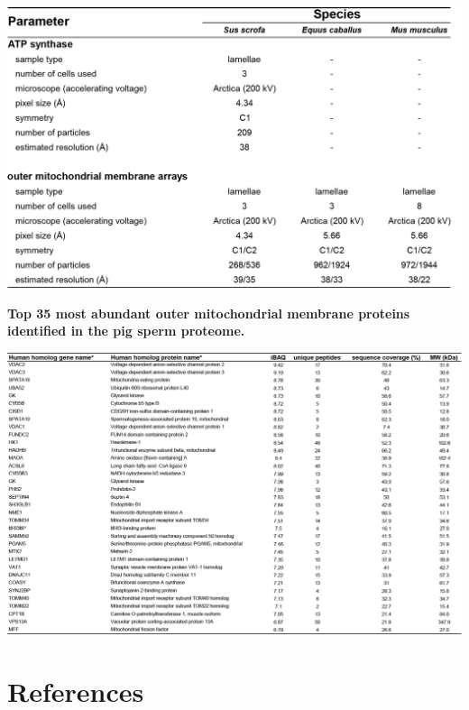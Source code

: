 \begin{subappendices}
\begin{table}[hbt!]
        \includegraphics[]{Chapter.4/Figures/SI_Table1.png}
        \label{tab:ch4_app_tab1}
    \end{table}
    \begin{table}[hbt!]
        \caption{\textbf{Top 35 most abundant outer mitochondrial membrane proteins identified in the pig sperm proteome.}}
        \includegraphics[]{Chapter.4/Figures/SI_Table2.png}
        \label{tab:ch4_app_tab2}
    \end{table}
\end{subappendices}
\clearpage
\section*{References}


